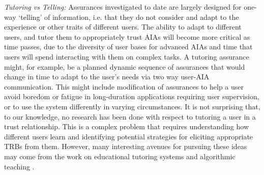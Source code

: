 \emph{Tutoring vs Telling:}
Assurances investigated to date are largely designed for one-way `telling' of information, i.e. that they do not consider and adapt to the experience or other traits of different users. The ability to adapt to different users, and tutor them to appropriately trust AIAs will become more critical as time passes, due to the diversity of user bases for advanced AIAs and time that users will spend interacting with them on complex tasks. A tutoring assurance might, for example, be a planned dynamic sequence of assurances that would change in time to adapt to the user's needs via two way user-AIA communication. This might include modification of assurances to help a user avoid boredom or fatigue in long-duration applications requiring user supervision, or to use the system differently in varying circumstances. It is not surprising that, to our knowledge, no research has been done with respect to tutoring a user in a trust relationship. This is a complex problem that requires understanding how different users learn and identifying potential strategies for eliciting appropriate TRBs from them. However, many interesting avenues for pursuing these ideas may come from the work on educational tutoring systems \cite{Wenger2014-ld} and algorithmic teaching  \cite{Balbach2009-jw}.
